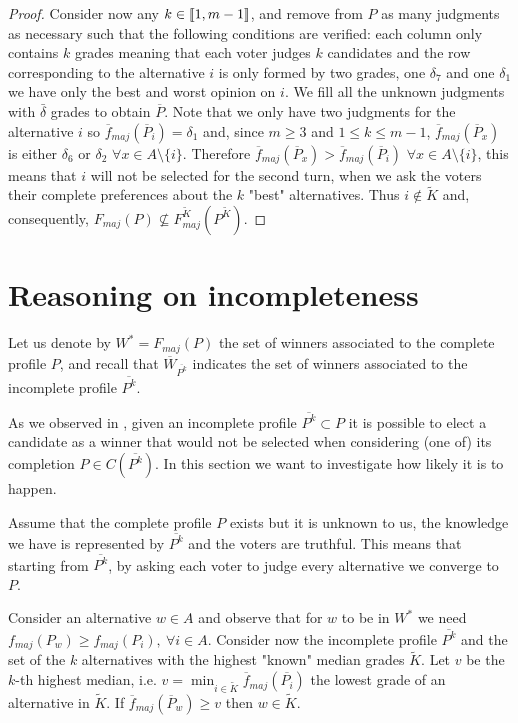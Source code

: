 \documentclass[version=3.21, pagesize, twoside=off, bibliography=totoc, DIV=calc, fontsize=12pt, a4paper]{scrartcl}
\begin{document}
\begin{proof}
	Consider now any $k \in \llbracket1,m-1\rrbracket$, and remove from $P$ as many judgments as necessary such that the following conditions are verified: each column only contains $k$ grades \textemdash meaning that each voter judges $k$ candidates \textemdash and the row corresponding to the alternative $i$ is only formed by two grades, one $\delta_7$ and one $\delta_1$ \textemdash we have only the best and worst opinion on $i$. We fill all the unknown judgments with $\bar{\delta}$ grades to obtain $\overline{P}$. Note that we only have two judgments for the alternative $i$ so $\overline{f}_{maj}(\overline{P}_i)=\delta_1$ and, since $m\geq3$ and $1 \leq k \leq m-1$, $\overline{f}_{maj}(\overline{P}_x)$ is either $\delta_6$ or $\delta_2$ $\forall x \in A \setminus \{i\}$. Therefore $\overline{f}_{maj}(\overline{P}_x) > \overline{f}_{maj}(\overline{P}_i)$ $\forall x \in A \setminus \{i\}$, this means that $i$ will not be selected for the second turn, when we ask the voters their complete preferences about the $k$ "best" alternatives. Thus $i \notin \tilde{K}$ and, consequently, $F_{maj}(P) \nsubseteq F^{\tilde{K}}_{maj}(P^{\tilde{K}})$.
\end{proof}


\section{Reasoning on incompleteness}
Let us denote by $W^*=F_{maj}(P)$ the set of winners associated to the complete profile $P$, and recall that $\overline{W}_{\overline{P^k}}$ indicates the set of winners associated to the incomplete profile $\overline{P^k}$.

As we observed in , given an incomplete profile $\overline{P^k} \subset P$ it is possible to elect a candidate as a winner that would not be selected when considering (one of) its completion $P \in C(\overline{P^k})$. In this section we want to investigate how likely it is to happen.

Assume that the complete profile $P$ exists but it is unknown to us, the knowledge we have is represented by $\overline{P^k}$ and the voters are truthful. 
This means that starting from $\overline{P^k}$, by asking each voter to judge every alternative we converge to $P$.

Consider an alternative $w\in A$ and observe that for $w$ to be in $W^*$ we need $f_{maj}(P_w)\geq f_{maj}(P_i), \ \forall i \in A$. 
Consider now the incomplete profile $\overline{P^k}$ and the set of the $k$ alternatives with the highest "known" median grades $\tilde{K}$. 
Let $v$ be the $k$-th highest median, i.e. $v=\min_{i\in \tilde{K}} \overline{f}_{maj}(\overline{P_i})$ the lowest grade of an alternative in $\tilde{K}$. If $\overline{f}_{maj}(\overline{P}_w) \geq v$ then $w \in \tilde{K}$. 
\end{document}
